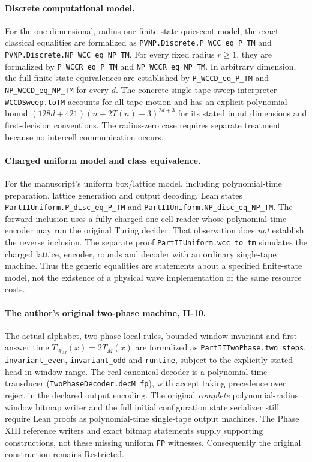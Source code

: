 \documentclass[12pt]{article}
\begin{document}
\paragraph{Discrete computational model.}
For the one-dimensional, radius-one finite-state
quiescent model, the exact classical equalities
are formalized as
\nolinkurl{PVNP.Discrete.P_WCC_eq_P_TM} and
\nolinkurl{PVNP.Discrete.NP_WCC_eq_NP_TM}.
For every fixed radius $r\ge1$, they are formalized
by \texttt{P\_WCCR\_eq\_P\_TM} and
\texttt{NP\_WCCR\_eq\_NP\_TM}.
In arbitrary dimension, the full finite-state
equivalences are established by
\texttt{P\_WCCD\_eq\_P\_TM} and
\texttt{NP\_WCCD\_eq\_NP\_TM} for every $d$.
The concrete single-tape sweep interpreter
\texttt{WCCDSweep.toTM} accounts for all tape
motion and has an explicit polynomial bound
$(128d+421)(n+2T(n)+3)^{2d+3}$ for its stated
input dimensions and first-decision conventions.
The radius-zero case requires separate treatment
because no intercell communication occurs.

\paragraph{Charged uniform model and class equivalence.}
For the manuscript's uniform box/lattice model,
including polynomial-time preparation, lattice
generation and output decoding, Lean states
\nolinkurl{PartIIUniform.P_disc_eq_P_TM}
and \nolinkurl{PartIIUniform.NP_disc_eq_NP_TM}.
The forward inclusion uses a fully charged
one-cell reader whose polynomial-time encoder
may run the original Turing decider.
That observation does \emph{not} establish the
reverse inclusion.  The separate proof
\nolinkurl{PartIIUniform.wcc_to_tm}
simulates the charged lattice, encoder, rounds
and decoder with an ordinary single-tape
machine.  Thus the generic equalities are
statements about a specified finite-state
model, not the existence of a physical wave
implementation of the same resource costs.

\paragraph{The author's original two-phase machine, II-10.}
The actual alphabet, two-phase local rules,
bounded-window invariant and first-answer
time $T_{W_M}(x)=2T_M(x)$ are formalized as
\nolinkurl{PartIITwoPhase.two_steps},
\texttt{invariant\_even}, \texttt{invariant\_odd}
and \texttt{runtime}, subject to the explicitly
stated head-in-window range.
The real canonical decoder is a
polynomial-time transducer
(\nolinkurl{TwoPhaseDecoder.decM_fp}),
with accept taking precedence over reject
in the declared output encoding.
The original \emph{complete} polynomial-radius
window bitmap writer and the full initial
configuration state serializer still require
Lean proofs as polynomial-time single-tape
output machines.  The Phase XIII reference
writers and exact bitmap statements supply
supporting constructions, not these missing
uniform \texttt{FP} witnesses.  Consequently
the original construction remains Restricted.
\end{document}
